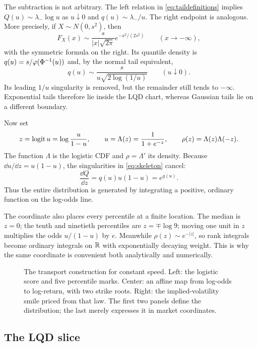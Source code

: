 The subtraction is not arbitrary.  The left relation in
\eqref{eq:taildefinitions} implies
$Q(u)\sim\lambda_-\log u$ as $u\downarrow0$ and
$q(u)\sim\lambda_-/u$.  The right endpoint is analogous.  More precisely, if
$X\sim N(0,s^2)$, then
\[
F_X(x)\sim \frac{s}{|x|\sqrt{2\pi}}e^{-x^2/(2s^2)}
\qquad(x\to-\infty),
\]
with the symmetric formula on the right.  Its quantile density is
$q(u)=s/\varphi(\Phi^{-1}(u))$ and, by the normal tail equivalent,
\[
q(u)\sim\frac{s}{u\sqrt{2\log(1/u)}}\qquad(u\downarrow0).
\]
Its leading $1/u$ singularity is removed, but the remainder still tends to
$-\infty$.  Exponential tails therefore lie inside the LQD chart, whereas
Gaussian tails lie on a different boundary.

Now set
\begin{equation}
z=\operatorname{logit} u=\log\frac{u}{1-u},\qquad
u=\Lambda(z)=\frac1{1+e^{-z}},\qquad
\rho(z)=\Lambda(z)\Lambda(-z).
\label{eq:logodds}
\end{equation}
The function $\Lambda$ is the logistic CDF and $\rho=\Lambda'$ its density.
Because $\dd u/\dd z=u(1-u)$, the singularities in \eqref{eq:skeleton}
cancel:
\begin{equation}
\frac{\dd Q}{\dd z}=q(u)u(1-u)=e^{g(u)}.
\label{eq:speed}
\end{equation}
Thus the entire distribution is generated by integrating a positive,
ordinary function on the log-odds line.

The coordinate also places every percentile at a finite location.  The median
is $z=0$; the tenth and ninetieth percentiles are
$z=\mp\log9$; moving one unit in $z$ multiplies the odds $u/(1-u)$ by $e$.
Meanwhile $\rho(z)\sim e^{-|z|}$, so rank integrals become ordinary integrals
on $\mathbb{R}$ with exponentially decaying weight.  This is why the same coordinate
is convenient both analytically and numerically.

\begin{figure}[htbp]
\centering
{}
\caption{The transport construction for constant speed.  Left: the logistic
score and five percentile marks.  Center: an affine map from log-odds to
log-return, with two strike roots.  Right: the implied-volatility smile priced
from that law.  The first two panels define the distribution; the last merely
expresses it in market coordinates.}
\label{fig:transport}
\end{figure}

\subsection{The LQD slice}

